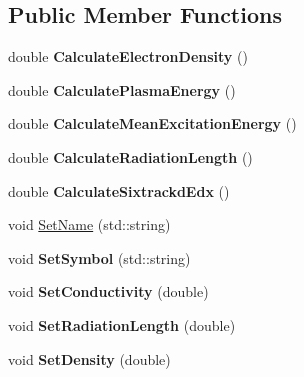 \subsection*{Public Member Functions}
\begin{DoxyCompactItemize}
\item 
\mbox{\label{classMaterialMixture_ab745b38374c60bc9f93c269ba7f8f743}} 
double {\bfseries Calculate\+Electron\+Density} ()
\item 
\mbox{\label{classMaterialMixture_a6d51b9ff9a5bda54547b591234defb15}} 
double {\bfseries Calculate\+Plasma\+Energy} ()
\item 
\mbox{\label{classMaterialMixture_a3b79778fd0400c2e2de547108eb13d73}} 
double {\bfseries Calculate\+Mean\+Excitation\+Energy} ()
\item 
\mbox{\label{classMaterialMixture_ad8e5edfd8491d95da2e839252f271db4}} 
double {\bfseries Calculate\+Radiation\+Length} ()
\item 
\mbox{\label{classMaterialMixture_a5ed458e5de0e2e4a39c2ffa8924cbcac}} 
double {\bfseries Calculate\+Sixtrackd\+Edx} ()
\item 
void \hyperlink{classMaterialMixture_ad6e1e1e953197836fc0252ea5d4aa393}{Set\+Name} (std\+::string)
\item 
\mbox{\label{classMaterialMixture_ab156207a51ae5114255b1333f5bb62fd}} 
void {\bfseries Set\+Symbol} (std\+::string)
\item 
\mbox{\label{classMaterialMixture_a82ae091e47b5ca3e5f7b27807aff1c40}} 
void {\bfseries Set\+Conductivity} (double)
\item 
\mbox{\label{classMaterialMixture_a80252497f674d6542da115e3b03e3536}} 
void {\bfseries Set\+Radiation\+Length} (double)
\item 
\mbox{\label{classMaterialMixture_a89fc43f0cb4b2fe4669f1fb902bc7bb7}} 
void {\bfseries Set\+Density} (double)
\item 
\mbox{\label{classMaterialMixture_a848b137efcf54e6aa132cfcd1cb5792f}} 

\end{DoxyCompactItemize}
